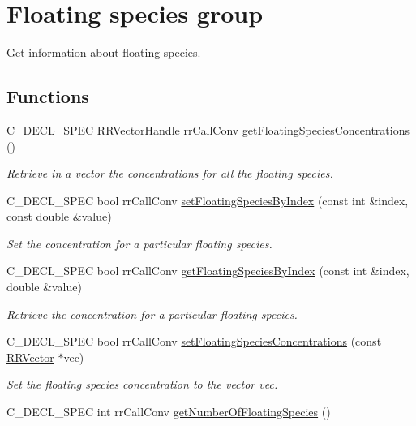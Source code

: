 \hypertarget{group__floating}{
\section{\-Floating species group}
\label{group__floating}
}


\-Get information about floating species.  


\subsection*{\-Functions}
\begin{DoxyCompactItemize}
\item 
\-C\-\_\-\-D\-E\-C\-L\-\_\-\-S\-P\-E\-C \hyperlink{rr__c__types_8h_aea46a16752b0ae2cd95c009030ee630e}{\-R\-R\-Vector\-Handle} \*
rr\-Call\-Conv \hyperlink{group__floating_ga0db8fe5f89985f27ea4ddb3c595b16fd}{get\-Floating\-Species\-Concentrations} ()
\begin{DoxyCompactList}\small\item\em \-Retrieve in a vector the concentrations for all the floating species. \end{DoxyCompactList}\item 
\-C\-\_\-\-D\-E\-C\-L\-\_\-\-S\-P\-E\-C bool rr\-Call\-Conv \hyperlink{group__floating_gaf4a5a4d9b1ecf60d4b98189b4bcf2543}{set\-Floating\-Species\-By\-Index} (const int \&index, const double \&value)
\begin{DoxyCompactList}\small\item\em \-Set the concentration for a particular floating species. \end{DoxyCompactList}\item 
\-C\-\_\-\-D\-E\-C\-L\-\_\-\-S\-P\-E\-C bool rr\-Call\-Conv \hyperlink{group__floating_ga03a4d63d50d5d17ef4af232f8ccee67a}{get\-Floating\-Species\-By\-Index} (const int \&index, double \&value)
\begin{DoxyCompactList}\small\item\em \-Retrieve the concentration for a particular floating species. \end{DoxyCompactList}\item 
\-C\-\_\-\-D\-E\-C\-L\-\_\-\-S\-P\-E\-C bool rr\-Call\-Conv \hyperlink{group__floating_ga669901c6de958af640b9ac80429e616e}{set\-Floating\-Species\-Concentrations} (const \hyperlink{struct_r_r_vector}{\-R\-R\-Vector} $\ast$vec)
\begin{DoxyCompactList}\small\item\em \-Set the floating species concentration to the vector vec. \end{DoxyCompactList}\item 
\hypertarget{group__floating_ga9a96b81c58073caff01ea2c9e0f5e119}{
\-C\-\_\-\-D\-E\-C\-L\-\_\-\-S\-P\-E\-C int rr\-Call\-Conv \hyperlink{group__floating_ga9a96b81c58073caff01ea2c9e0f5e119}{get\-Number\-Of\-Floating\-Species} ()}
\label{group__floating_ga9a96b81c58073caff01ea2c9e0f5e119}


\end{DoxyCompactItemize}
